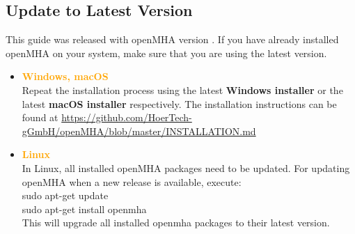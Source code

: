 \documentclass[11pt,a4paper,twoside]{article}
\newcommand{\+}{\discretionary{\mbox{\scriptsize$\hookleftarrow$}}{}{}}
\begin{document}

\subsection{Update to Latest Version}

This guide was released with openMHA version \MHAversion.
If you have already installed openMHA on your system, make
sure that you are using the latest version. \\
\begin{itemize}
\item \textcolor{orange}{\textbf{Windows, macOS}} \\
  Repeat the installation process using the latest \textbf{Windows installer}
  or the latest \textbf{macOS installer} respectively.
  The installation instructions can be found at
  \url{https://github.com/HoerTech-gGmbH/openMHA/blob/master/INSTALLATION.md}
\item \textcolor{orange}{\textbf{Linux}} \\
  In Linux, all installed openMHA packages need to be updated.
  For updating openMHA when a new release is available, execute: \\ 
{\ttfamily sudo apt-get update} \\
{\ttfamily sudo apt-get install openmha} \\
This will upgrade all installed openmha packages to their latest version.
\end{itemize}
\end{document}
